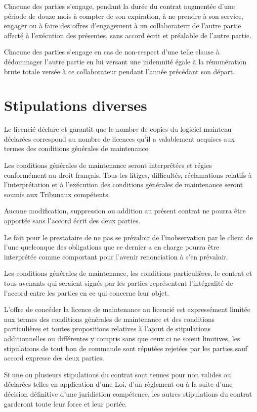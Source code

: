 \documentclass[11pt]{article}
\begin{document}
Chacune des parties s'engage, pendant la durée du contrat augmentée d'une période de douze mois à compter de son expiration, à ne prendre à son service, engager ou à faire des offres d'engagement à un collaborateur de l'autre partie affecté à l'exécution des présentes, sans accord écrit et préalable de l'autre partie.

Chacune des parties s'engage en cas de non-respect d'une telle clause à dédommager l'autre partie en lui versant une indemnité égale à la rémunération brute totale versée à ce collaborateur pendant l'année précédant son départ.

\section{Stipulations diverses}

Le licencié déclare et garantit que le nombre de copies du logiciel maintenu déclarées correspond au nombre de licences qu'il a valablement acquises aux termes des conditions générales de maintenance.

Les conditions générales de maintenance seront interprétées et régies conformément au droit français.
Tous les litiges, difficultés, réclamations relatifs à l'interprétation et à l'exécution des conditions générales de maintenance seront soumis aux Tribunaux compétents.

Aucune modification, suppression ou addition au présent contrat ne pourra être apportée sans l'accord écrit des deux parties.

Le fait pour le prestataire de ne pas se prévaloir de l'inobservation par le client de l'une quelconque des obligations que ce dernier a en charge pourra être interprétée comme comportant pour l'avenir renonciation à s'en prévaloir.

Les conditions générales de maintenance, les conditions particulières, le contrat et tous avenants qui seraient signés par les parties représentent l'intégralité de l'accord entre les parties en ce qui concerne leur objet.

L'offre de concéder la licence de maintenance au licencié est expressément limitée aux termes des conditions générales de maintenance et des conditions particulières et toutes propositions relatives à l'ajout de stipulations additionnelles ou différentes y compris sans que ceux ci ne soient limitives, les stipulations de tout bon de commande sont réputées rejetées par les parties sauf accord expresse des deux parties.

Si une ou plusieurs stipulations du contrat sont tenues pour non valides ou déclarées telles en application d'une Loi, d'un règlement ou à la suite d'une décision définitive d'une juridiction compétence, les autres stipulations du contrat garderont toute leur force et leur portée.
\end{document}
